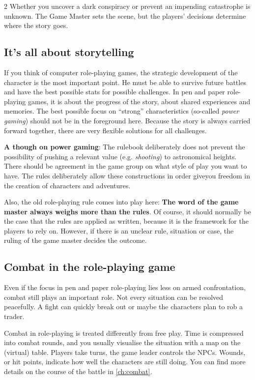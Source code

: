 \begin{multicols}{2}
Whether you uncover a dark conspiracy or prevent an impending catastrophe is unknown. The Game Master sets the scene, but the players' decisions determine where the story goes.

\subsection{It's all about storytelling} 

If you think of computer role-playing games, the strategic development of the character is the most important point. He must be able to survive future battles and have the best possible stats for possible challenges. In pen and paper role-playing games, it is about the progress of the story, about shared experiences and memories. The best possible focus on ``strong'' characteristics (so-called \textit{power gaming}) should not be in the foreground here. Because the story is always carried forward together, there are very flexible solutions for all challenges.

\textbf{A though on power gaming}: The  rulebook deliberately does not prevent the possibility of pushing a relevant value (e.g. \textit{shooting}) to astronomical heights. There should be agreement in the game group on what style of play you want to have. The rules deliberately allow these constructions in order giveyou freedom in the creation of characters and adventures.

Also, the old role-playing rule comes into play here: \textbf{The word of the game master always weighs more than the rules}. Of course, it should normally be the case that the rules are applied as written, because it is the framework for the players to rely on. However, if there is an unclear rule, situation or case, the ruling of the game master decides the outcome.

\subsection{Combat in the role-playing game}

Even if the focus in pen and paper role-playing lies less on armed confrontation, combat still plays an important role. Not every situation can be resolved peacefully. A fight can quickly break out or maybe the characters plan to rob a trader.

Combat in role-playing is treated differently from free play. Time is compressed into combat rounds, and you usually visualise the situation with a map on the (virtual) table. Players take turns, the game leader controls the NPCs. Wounds, or hit points, indicate how well the characters are still doing. You can find more details on the course of the battle in \cref{ch:combat}.


\end{multicols}
